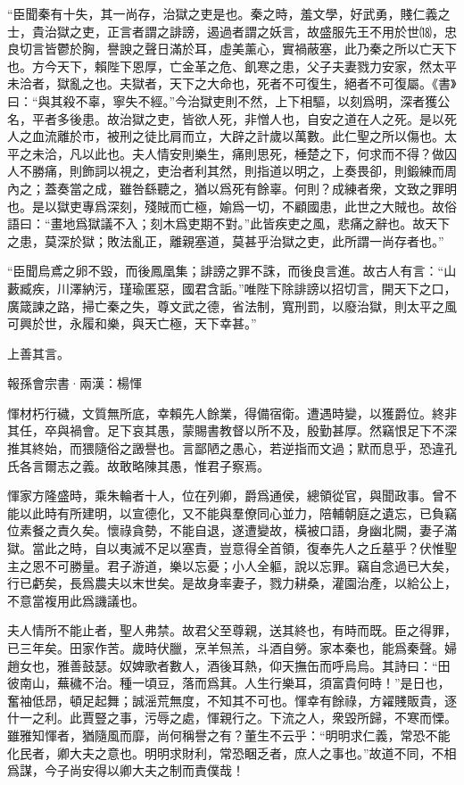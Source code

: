 \documentclass[12pt,a4paper]{ctexbook}
\begin{document}
“臣聞秦有十失，其一尚存，治獄之吏是也。秦之時，羞文學，好武勇，賤仁義之士，貴治獄之吏，正言者謂之誹謗，遏過者謂之妖言，故盛服先王不用於世⒅，忠良切言皆鬱於胸，譽諛之聲日滿於耳，虛美薰心，實禍蔽塞，此乃秦之所以亡天下也。方今天下，賴陛下恩厚，亡金革之危、飢寒之患，父子夫妻戮力安家，然太平未洽者，獄亂之也。夫獄者，天下之大命也，死者不可復生，絕者不可復屬。《書》曰：“與其殺不辜，寧失不經。”今治獄吏則不然，上下相驅，以刻爲明，深者獲公名，平者多後患。故治獄之吏，皆欲人死，非憎人也，自安之道在人之死。是以死人之血流離於市，被刑之徒比肩而立，大辟之計歲以萬數。此仁聖之所以傷也。太平之未洽，凡以此也。夫人情安則樂生，痛則思死，棰楚之下，何求而不得？做囚人不勝痛，則飾詞以視之，吏治者利其然，則指道以明之，上奏畏卻，則鍛練而周內之；蓋奏當之成，雖咎繇聽之，猶以爲死有餘辜。何則？成練者衆，文致之罪明也。是以獄吏專爲深刻，殘賊而亡極，媮爲一切，不顧國患，此世之大賊也。故俗語曰：“畫地爲獄議不入；刻木爲吏期不對。”此皆疾吏之風，悲痛之辭也。故天下之患，莫深於獄；敗法亂正，離親塞道，莫甚乎治獄之吏，此所謂一尚存者也。”\par
“臣聞烏鳶之卵不毀，而後鳳凰集；誹謗之罪不誅，而後良言進。故古人有言：“山藪臧疾，川澤納污，瑾瑜匿惡，國君含詬。”唯陛下除誹謗以招切言，開天下之口，廣箴諫之路，掃亡秦之失，尊文武之德，省法制，寬刑罰，以廢治獄，則太平之風可興於世，永履和樂，與天亡極，天下幸甚。”\par
上善其言。\par
報孫會宗書·兩漢：楊惲 \par
惲材朽行穢，文質無所底，幸賴先人餘業，得備宿衛。遭遇時變，以獲爵位。終非其任，卒與禍會。足下哀其愚，蒙賜書教督以所不及，殷勤甚厚。然竊恨足下不深推其終始，而猥隨俗之譭譽也。言鄙陋之愚心，若逆指而文過；默而息乎，恐違孔氏各言爾志之義。故敢略陳其愚，惟君子察焉。\par
惲家方隆盛時，乘朱輪者十人，位在列卿，爵爲通侯，總領從官，與聞政事。曾不能以此時有所建明，以宣德化，又不能與羣僚同心並力，陪輔朝庭之遺忘，已負竊位素餐之責久矣。懷祿貪勢，不能自退，遂遭變故，橫被口語，身幽北闕，妻子滿獄。當此之時，自以夷滅不足以塞責，豈意得全首領，復奉先人之丘墓乎？伏惟聖主之恩不可勝量。君子游道，樂以忘憂；小人全軀，說以忘罪。竊自念過已大矣，行已虧矣，長爲農夫以末世矣。是故身率妻子，戮力耕桑，灌園治產，以給公上，不意當複用此爲譏議也。\par
夫人情所不能止者，聖人弗禁。故君父至尊親，送其終也，有時而既。臣之得罪，已三年矣。田家作苦。歲時伏臘，烹羊炰羔，斗酒自勞。家本秦也，能爲秦聲。婦趙女也，雅善鼓瑟。奴婢歌者數人，酒後耳熱，仰天撫缶而呼烏烏。其詩曰：“田彼南山，蕪穢不治。種一頃豆，落而爲萁。人生行樂耳，須富貴何時！”是日也，奮袖低昂，頓足起舞；誠滛荒無度，不知其不可也。惲幸有餘祿，方糴賤販貴，逐什一之利。此賈豎之事，污辱之處，惲親行之。下流之人，衆毀所歸，不寒而慄。雖雅知惲者，猶隨風而靡，尚何稱譽之有？董生不云乎：“明明求仁義，常恐不能化民者，卿大夫之意也。明明求財利，常恐睏乏者，庶人之事也。”故道不同，不相爲謀，今子尚安得以卿大夫之制而責僕哉！\par
\end{document}
